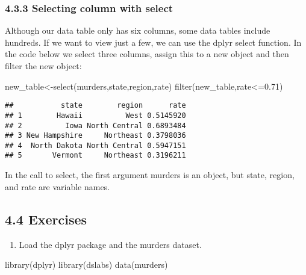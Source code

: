 \documentclass[
]{article}
\newenvironment{Shaded}{\begin{snugshade}}{\end{snugshade}}
\newcommand{\FloatTok}[1]{\textcolor[rgb]{0.00,0.00,0.81}{#1}}
\newcommand{\FunctionTok}[1]{\textcolor[rgb]{0.00,0.00,0.00}{#1}}
\newcommand{\NormalTok}[1]{#1}
\newcommand{\OtherTok}[1]{\textcolor[rgb]{0.56,0.35,0.01}{#1}}
\newcommand{\SpecialCharTok}[1]{\textcolor[rgb]{0.00,0.00,0.00}{#1}}
\providecommand{\tightlist}{%
  \setlength{\itemsep}{0pt}\setlength{\parskip}{0pt}}
\begin{document}
\hypertarget{selecting-column-with-select}{%
\subsubsection{4.3.3 Selecting column with
select}\label{selecting-column-with-select}}

Although our data table only has six columns, some data tables include
hundreds. If we want to view just a few, we can use the dplyr select
function. In the code below we select three columns, assign this to a
new object and then filter the new object:

\begin{Shaded}
\begin{Highlighting}[]
\NormalTok{new\_table}\OtherTok{\textless{}{-}}\FunctionTok{select}\NormalTok{(murders,state,region,rate)}
\FunctionTok{filter}\NormalTok{(new\_table,rate}\SpecialCharTok{\textless{}=}\FloatTok{0.71}\NormalTok{)}
\end{Highlighting}
\end{Shaded}

\begin{verbatim}
##           state        region      rate
## 1        Hawaii          West 0.5145920
## 2          Iowa North Central 0.6893484
## 3 New Hampshire     Northeast 0.3798036
## 4  North Dakota North Central 0.5947151
## 5       Vermont     Northeast 0.3196211
\end{verbatim}

In the call to select, the first argument murders is an object, but
state, region, and rate are variable names.

\hypertarget{exercises-1}{%
\subsection{4.4 Exercises}\label{exercises-1}}

\begin{enumerate}
\def\labelenumi{\arabic{enumi}.}
\tightlist
\item
  Load the dplyr package and the murders dataset.
\end{enumerate}

\begin{Shaded}
\begin{Highlighting}[]
\FunctionTok{library}\NormalTok{(dplyr)}
\FunctionTok{library}\NormalTok{(dslabs)}
\FunctionTok{data}\NormalTok{(murders)}
\end{Highlighting}
\end{Shaded}
\end{document}
